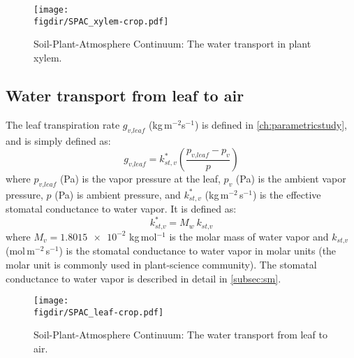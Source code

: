 \begin{figure}[t]
	\centering
	\texttt{[image: \\figdir/SPAC\_xylem-crop.pdf]}
	\caption{Soil-Plant-Atmosphere Continuum: The water transport in plant xylem.}
	\label{fig:SPAC_xylem}
\end{figure}


\subsection{Water transport from leaf to air}

The leaf transpiration rate $g_{\textit{v,leaf}}$ (kg\,m$^{-2}$s$^{-1}$) is defined in \cref{ch:parametricstudy}, and is simply defined as:
\begin{equation}
g_{\textit{v,leaf}} = k_{st,v}^* \left(\frac{p_{\textit{v,leaf}} - p_v}{p}\right)
\end{equation}
where $p_{\textit{v,leaf}}$ (Pa) is the vapor pressure at the leaf, $p_v$ (Pa) is the ambient vapor pressure, $p$ (Pa) is ambient pressure, and $k_{st,v}^*$ (kg\,m$^{-2}$\,s$^{-1}$) is the effective stomatal conductance to water vapor. It is defined as:
\begin{equation}
k_{\textit{st,v}}^* = M_w~k_{\textit{st,v}}
\end{equation}
where $M_v = \num{1.8015e-2}$ kg\,mol$^{-1}$ is the molar mass of water vapor and $k_{\textit{st,v}}$ (mol$\,$m$^{-2}$$\,$s$^{-1}$) is the stomatal conductance to water vapor in molar units (the molar unit is commonly used in plant-science community). The stomatal conductance to water vapor is described in detail in \cref{subsec:sm}.

\begin{figure}[t]
	\centering
	\texttt{[image: \\figdir/SPAC\_leaf-crop.pdf]}
	\caption{Soil-Plant-Atmosphere Continuum: The water transport from leaf to air.}
	\label{fig:SPAC_leaf}
\end{figure}

